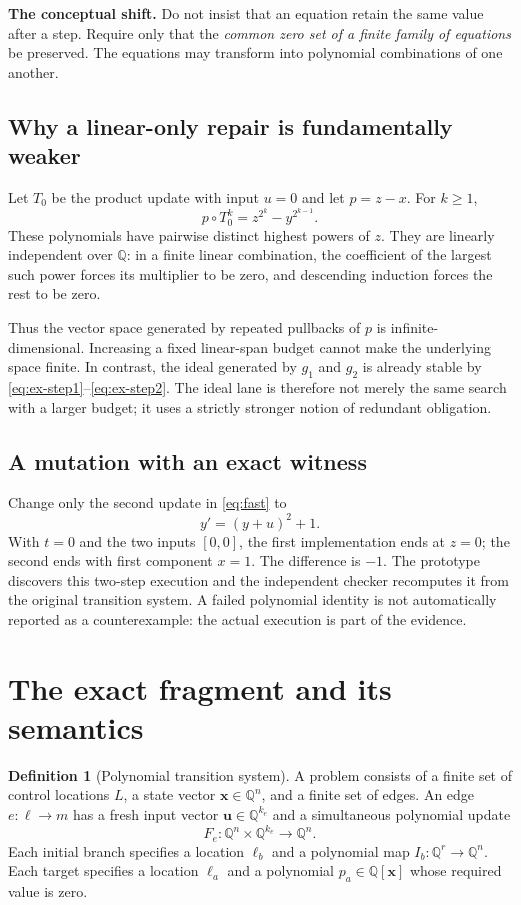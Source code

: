 \documentclass[11pt,letterpaper]{article}
\theoremstyle{definition}
\newtheorem{definition}[theorem]{Definition}
\newcommand{\Q}{\mathbb Q}
\begin{document}
\begin{focusbox}
\textbf{The conceptual shift.} Do not insist that an equation retain the same
value after a step. Require only that the \emph{common zero set of a finite
family of equations} be preserved. The equations may transform into polynomial
combinations of one another.
\end{focusbox}

\subsection{Why a linear-only repair is fundamentally weaker}
Let $T_0$ be the product update with input $u=0$ and let $p=z-x$. For $k\ge1$,
\[
 p\circ T_0^k=z^{2^k}-y^{2^{k-1}}.
\]
These polynomials have pairwise distinct highest powers of $z$. They are
linearly independent over $\Q$: in a finite linear combination, the coefficient
of the largest such power forces its multiplier to be zero, and descending
induction forces the rest to be zero.

Thus the vector space generated by repeated pullbacks of $p$ is infinite-dimensional. Increasing a fixed linear-span budget cannot make the underlying
space finite. In contrast, the ideal generated by $g_1$ and $g_2$ is already
stable by \eqref{eq:ex-step1}--\eqref{eq:ex-step2}. The ideal lane is therefore
not merely the same search with a larger budget; it uses a strictly stronger
notion of redundant obligation.

\subsection{A mutation with an exact witness}
Change only the second update in \eqref{eq:fast} to
\[
 y'=(y+u)^2+1.
\]
With $t=0$ and the two inputs $[0,0]$, the first implementation ends at $z=0$;
the second ends with first component $x=1$. The difference is $-1$. The
prototype discovers this two-step execution and the independent checker
recomputes it from the original transition system. A failed polynomial identity
is not automatically reported as a counterexample: the actual execution is
part of the evidence.

\section{The exact fragment and its semantics}
\label{sec:fragment}

\begin{definition}[Polynomial transition system]
A problem consists of a finite set of control locations $L$, a state vector
$\bm x\in\Q^n$, and a finite set of edges. An edge
$e:\ell\to m$ has a fresh input vector $\bm u\in\Q^{k_e}$ and a simultaneous
polynomial update
\[
 F_e:\Q^n\times\Q^{k_e}\longrightarrow\Q^n.
\]
Each initial branch specifies a location $\ell_b$ and a polynomial map
$I_b:\Q^r\to\Q^n$. Each target specifies a location $\ell_a$ and a polynomial
$p_a\in\Q[\bm x]$ whose required value is zero.
\end{definition}
\end{document}
